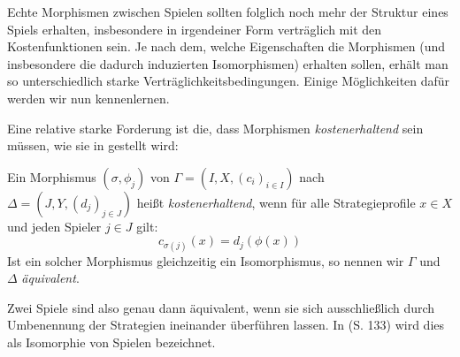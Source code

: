Echte Morphismen zwischen Spielen sollten folglich noch mehr der Struktur eines Spiels erhalten, insbesondere in irgendeiner Form \glqq verträglich\grqq{} mit den Kostenfunktionen sein. Je nach dem, welche Eigenschaften die Morphismen (und insbesondere die dadurch induzierten Isomorphismen) erhalten sollen, erhält man so unterschiedlich starke Verträglichkeitsbedingungen. Einige Möglichkeiten dafür werden wir nun kennenlernen.

Eine relative starke Forderung ist die, dass Morphismen \emph{kostenerhaltend} sein müssen, wie sie in \cite{ReprOfFiniteGamesAsNCG} gestellt wird:

\begin{defn}
	Ein Morphismus $(\sigma, \phi_j)$ von $\Gamma = (I, X, (c_i)_{i\in I})$ nach $\Delta = (J, Y, (d_j)_{j\in J})$ heißt \emph{kostenerhaltend}, wenn für alle Strategieprofile $x \in X$ und jeden Spieler $j \in J$ gilt:
		\[c_{\sigma(j)}(x) = d_j(\phi(x)) \]
	Ist ein solcher Morphismus gleichzeitig ein Isomorphismus, so nennen wir $\Gamma$ und $\Delta$ \emph{äquivalent}.
\end{defn}

\begin{bem}
	Zwei Spiele sind also genau dann äquivalent, wenn sie sich ausschließlich durch Umbenennung der Strategien ineinander überführen lassen. In \cite{MonShap} (S. 133) wird dies als Isomorphie von Spielen bezeichnet.
\end{bem}

